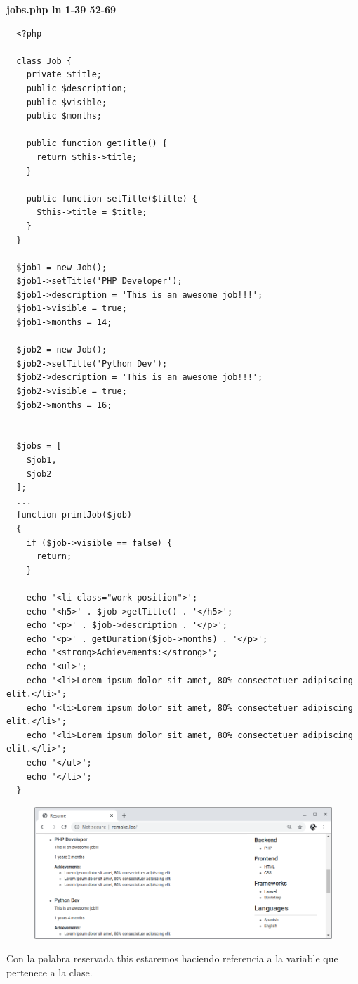 \documentclass{article}
\begin{document}
\textbf{jobs.php ln 1-39 52-69}
\begin{verbatim}
  <?php

  class Job {
    private $title;
    public $description;
    public $visible;
    public $months;

    public function getTitle() {
      return $this->title;
    }

    public function setTitle($title) {
      $this->title = $title;
    }
  }

  $job1 = new Job();
  $job1->setTitle('PHP Developer');
  $job1->description = 'This is an awesome job!!!';
  $job1->visible = true;
  $job1->months = 14;

  $job2 = new Job();
  $job2->setTitle('Python Dev');
  $job2->description = 'This is an awesome job!!!';
  $job2->visible = true;
  $job2->months = 16;


  $jobs = [
    $job1,
    $job2
  ];
  ...
  function printJob($job)
  {
    if ($job->visible == false) {
      return;
    }

    echo '<li class="work-position">';
    echo '<h5>' . $job->getTitle() . '</h5>';
    echo '<p>' . $job->description . '</p>';
    echo '<p>' . getDuration($job->months) . '</p>';
    echo '<strong>Achievements:</strong>';
    echo '<ul>';
    echo '<li>Lorem ipsum dolor sit amet, 80% consectetuer adipiscing elit.</li>';
    echo '<li>Lorem ipsum dolor sit amet, 80% consectetuer adipiscing elit.</li>';
    echo '<li>Lorem ipsum dolor sit amet, 80% consectetuer adipiscing elit.</li>';
    echo '</ul>';
    echo '</li>';
  }
\end{verbatim}

\newpage

\begin{figure}[h!]
  \centering
  \includegraphics[scale=0.5]{./Pictures/041_set_get.png}
\end{figure}

Con la palabra reservada this estaremos haciendo referencia a la variable que
pertenece a la clase.\\
\end{document}
